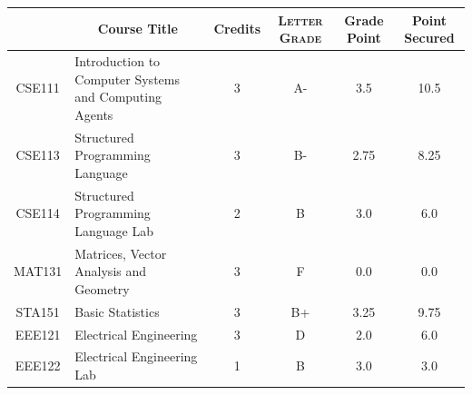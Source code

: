 \documentclass[11pt]{article}
\newcommand*{\numtwo}[1]{\pgfmathprintnumber[
                    fixed, precision=2, fixed zerofill=true]{#1}}
\begin{document}
                \begin{center}
                    \renewcommand{\arraystretch}{1.08}
                    
                \begin{tabular}{|c|l|c|>{\scshape}c|c|c|}
                \hline  \rule[-1ex]{0pt}{3.5ex} {\centering{\bf Course Code}} &  \multicolumn{1}{c|}{\textbf{Course Title}}  & {\bf Credits} & {\bf Letter Grade} & {\bf Grade Point} & {\bf Point Secured}  \\ 
                \hline   CSE111 &  Introduction to Computer Systems and Computing Agents		 & 3 & A- & 3.5 & 10.5 \\ %
                \hline   CSE113 &  Structured Programming Language		 & 3 & B- & 2.75 & 8.25 \\ %
                \hline   CSE114 &  Structured Programming Language Lab		 & 2 & B & 3.0 & 6.0 \\ %
                \hline   MAT131 &  Matrices, Vector Analysis and Geometry		 & 3 & F & 0.0 & 0.0 \\ %
                \hline   STA151 &  Basic Statistics		 & 3 & B+ & 3.25 & 9.75 \\ %
                \hline   EEE121 &  Electrical Engineering		 & 3 & D & 2.0 & 6.0 \\ %
                \hline   EEE122 &  Electrical Engineering Lab		 & 1 & B & 3.0 & 3.0 \\ %

\hline                %
                \end{tabular}
                \end{center}
                \renewcommand{\arraystretch}{1.03}
\end{document}
